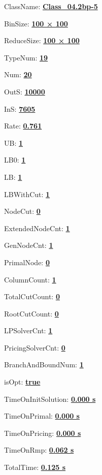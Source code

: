 \documentclass[11pt]{article}
\begin{document}
\pagestyle{empty}


ClassName: \underline{\textbf{Class_04.2bp-5}}
\par
BinSize: \underline{\textbf{100 × 100}}
\par
ReduceSize: \underline{\textbf{100 × 100}}
\par
TypeNum: \underline{\textbf{19}}
\par
Num: \underline{\textbf{20}}
\par
OutS: \underline{\textbf{10000}}
\par
InS: \underline{\textbf{7605}}
\par
Rate: \underline{\textbf{0.761}}
\par
UB: \underline{\textbf{1}}
\par
LB0: \underline{\textbf{1}}
\par
LB: \underline{\textbf{1}}
\par
LBWithCut: \underline{\textbf{1}}
\par
NodeCut: \underline{\textbf{0}}
\par
ExtendedNodeCnt: \underline{\textbf{1}}
\par
GenNodeCnt: \underline{\textbf{1}}
\par
PrimalNode: \underline{\textbf{0}}
\par
ColumnCount: \underline{\textbf{1}}
\par
TotalCutCount: \underline{\textbf{0}}
\par
RootCutCount: \underline{\textbf{0}}
\par
LPSolverCnt: \underline{\textbf{1}}
\par
PricingSolverCnt: \underline{\textbf{0}}
\par
BranchAndBoundNum: \underline{\textbf{1}}
\par
isOpt: \underline{\textbf{true}}
\par
TimeOnInitSolution: \underline{\textbf{0.000 s}}
\par
TimeOnPrimal: \underline{\textbf{0.000 s}}
\par
TimeOnPricing: \underline{\textbf{0.000 s}}
\par
TimeOnRmp: \underline{\textbf{0.062 s}}
\par
TotalTime: \underline{\textbf{0.125 s}}
\par
\newpage
\end{document}
